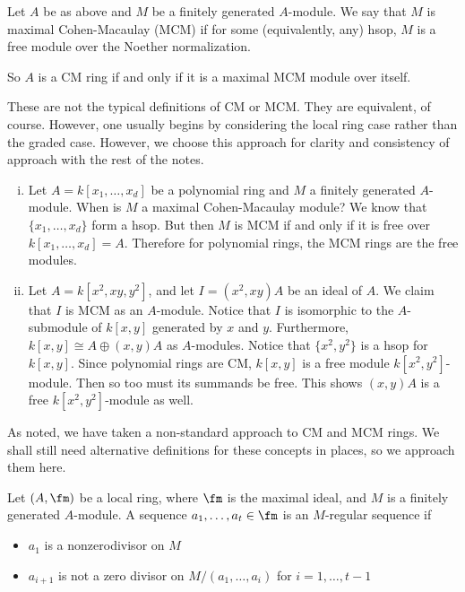 \begin{dfn}
Let $A$ be as above and $M$ be a finitely generated $A$-module. We say that $M$ is maximal Cohen-Macaulay (MCM) if for some (equivalently, any) hsop, $M$ is a free module over the Noether normalization. 
\end{dfn}


So $A$ is a CM ring if and only if it is a maximal MCM module over itself. 


\begin{rem}
These are not the typical definitions of CM or MCM. They are equivalent, of course. However, one usually begins by considering the local ring case rather than the graded case. However, we choose this approach for clarity and consistency of approach with the rest of the notes.
\end{rem}


\begin{ex} \hfill
\begin{enumerate}[(i)]
\item Let $A= k[x_1,\ldots,x_d]$ be a polynomial ring and $M$ a finitely generated $A$-module. When is $M$ a maximal Cohen-Macaulay module? We know that $\{x_1,\ldots,x_d\}$ form a hsop. But then $M$ is MCM if and only if it is free over $k[x_1,\ldots,x_d]= A$. Therefore for polynomial rings, the MCM rings are the free modules. 

\item Let $A= k[x^2,xy,y^2]$, and let $I= (x^2,xy)A$ be an ideal of $A$. We claim that $I$ is MCM as an $A$-module. Notice that $I$ is isomorphic to the $A$-submodule of $k[x,y]$ generated by $x$ and $y$. Furthermore, $k[x,y] \cong A \oplus (x,y)A$ as $A$-modules. Notice that $\{x^2,y^2\}$ is a hsop for $k[x,y]$. Since polynomial rings are CM, $k[x,y]$ is a free module $k[x^2,y^2]$-module. Then so too must its summands be free. This shows $(x,y)A$ is a free $k[x^2,y^2]$-module as well. 
\end{enumerate}
\end{ex}


As noted, we have taken a non-standard approach to CM and MCM rings. We shall still need alternative definitions for these concepts in places, so we approach them here.


\begin{dfn}[$M$-Regular]
Let $(A,\fm)$ be a local ring, where $\fm$ is the maximal ideal, and $M$ is a finitely generated $A$-module. A sequence $a_1,\ldots,a_t \in \fm$ is an $M$-regular sequence if
	\begin{itemize}
	\item $a_1$ is a nonzerodivisor on $M$
	\item $a_{i+1}$ is not a zero divisor on $M/(a_1,\ldots,a_i)$ for $i=1,\ldots,t-1$
	\end{itemize}
\end{dfn}


